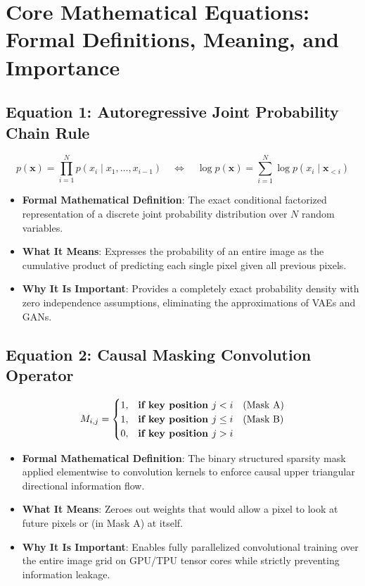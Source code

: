 \documentclass[11pt,a4paper]{article}
\theoremstyle{definition}
\begin{document}
\section{Core Mathematical Equations: Formal Definitions, Meaning, and Importance}

\subsection{\textbf{Equation 1: Autoregressive Joint Probability Chain Rule}}
{\boldmath
\begin{equation}
p(\mathbf{x}) = \prod_{i=1}^N p(x_i \mid x_1, \dots, x_{i-1}) \quad \Longleftrightarrow \quad \log p(\mathbf{x}) = \sum_{i=1}^N \log p(x_i \mid \mathbf{x}_{<i})
\end{equation}
}
\begin{itemize}
    \item \textbf{Formal Mathematical Definition}:
    The exact conditional factorized representation of a discrete joint probability distribution over $N$ random variables.
    \item \textbf{What It Means}:
    Expresses the probability of an entire image as the cumulative product of predicting each single pixel given all previous pixels.
    \item \textbf{Why It Is Important}:
    Provides a completely exact probability density with zero independence assumptions, eliminating the approximations of VAEs and GANs.
\end{itemize}

\subsection{\textbf{Equation 2: Causal Masking Convolution Operator}}
{\boldmath
\begin{equation}
M_{i, j} = \begin{cases} 1, & \text{\textbf{if key position }} j < i \quad (\text{Mask A}) \\ 1, & \text{\textbf{if key position }} j \le i \quad (\text{Mask B}) \\ 0, & \text{\textbf{if key position }} j > i \end{cases}
\end{equation}
}
\begin{itemize}
    \item \textbf{Formal Mathematical Definition}:
    The binary structured sparsity mask applied elementwise to convolution kernels to enforce causal upper triangular directional information flow.
    \item \textbf{What It Means}:
    Zeroes out weights that would allow a pixel to look at future pixels or (in Mask A) at itself.
    \item \textbf{Why It Is Important}:
    Enables fully parallelized convolutional training over the entire image grid on GPU/TPU tensor cores while strictly preventing information leakage.
\end{itemize}
\end{document}
